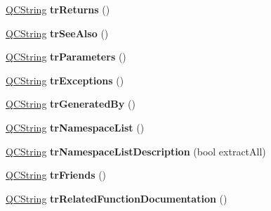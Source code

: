 \begin{DoxyCompactItemize}
\item 
\mbox{\label{class_translator_dutch_a2ce6db53e7b316a67bc0178d5d0d0453}} 
\mbox{\hyperlink{class_q_c_string}{Q\+C\+String}} {\bfseries tr\+Returns} ()
\item 
\mbox{\label{class_translator_dutch_a597ec967ff38aa0cc129fd998c51255b}} 
\mbox{\hyperlink{class_q_c_string}{Q\+C\+String}} {\bfseries tr\+See\+Also} ()
\item 
\mbox{\label{class_translator_dutch_a07df4bd953b94f0262fd65469f6ed01e}} 
\mbox{\hyperlink{class_q_c_string}{Q\+C\+String}} {\bfseries tr\+Parameters} ()
\item 
\mbox{\label{class_translator_dutch_a09d71e3b824a70eb9fd4c82767b0999c}} 
\mbox{\hyperlink{class_q_c_string}{Q\+C\+String}} {\bfseries tr\+Exceptions} ()
\item 
\mbox{\label{class_translator_dutch_a7069523f32ad0fe70e3a55466aef5945}} 
\mbox{\hyperlink{class_q_c_string}{Q\+C\+String}} {\bfseries tr\+Generated\+By} ()
\item 
\mbox{\label{class_translator_dutch_a3a25210caaddb1c707e23c208db2e0e0}} 
\mbox{\hyperlink{class_q_c_string}{Q\+C\+String}} {\bfseries tr\+Namespace\+List} ()
\item 
\mbox{\label{class_translator_dutch_a0c2f67455d6f6c3ff7da3fed8ba90071}} 
\mbox{\hyperlink{class_q_c_string}{Q\+C\+String}} {\bfseries tr\+Namespace\+List\+Description} (bool extract\+All)
\item 
\mbox{\label{class_translator_dutch_a91eb7105c9e6002339c7613c26efcb3d}} 
\mbox{\hyperlink{class_q_c_string}{Q\+C\+String}} {\bfseries tr\+Friends} ()
\item 
\mbox{\label{class_translator_dutch_ae1672e1c0ee26b6397489ea591b29362}} 
\mbox{\hyperlink{class_q_c_string}{Q\+C\+String}} {\bfseries tr\+Related\+Function\+Documentation} ()
\item 
\mbox{\label{class_translator_dutch_a256ebfe4667d1a200d25f17f6a35666f}} 

\end{DoxyCompactItemize}
